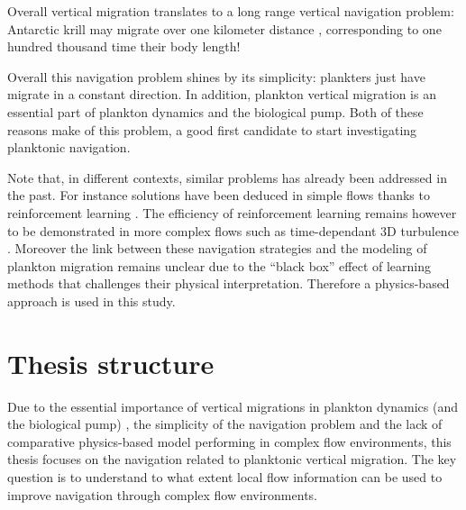 Overall vertical migration translates to a long range vertical navigation problem: Antarctic krill may migrate over one kilometer distance \citep{hamner1983behavior}, corresponding to one hundred thousand time their body length!

Overall this navigation problem shines by its simplicity: plankters just have migrate in a constant direction.
In addition, plankton vertical migration is an essential part of plankton dynamics and the biological pump.
Both of these reasons make of this problem, a good first candidate to start investigating planktonic navigation.

Note that, in different contexts, similar problems has already been addressed in the past. 
For instance solutions have been deduced in simple flows thanks to reinforcement learning \citep{colabrese2017flow, gustavsson2017finding}. 
The efficiency of reinforcement learning remains however to be demonstrated in more complex flows such as time-dependant 3D turbulence \citep{alageshan2020machine}.
Moreover the link between these navigation strategies and the modeling of plankton migration remains unclear due to the ``black box'' effect of learning methods that challenges their physical interpretation.
Therefore a physics-based approach is used in this study.

\section{Thesis structure}

Due to the essential importance of vertical migrations in plankton dynamics (and the biological pump) \citep{bianchi2013diel, archibald2019modeling}, the simplicity of the navigation problem and the lack of comparative physics-based model performing in complex flow environments, this thesis focuses on the navigation related to planktonic vertical migration.
The key question is to understand to what extent local flow information can be used to improve navigation through complex flow environments.

